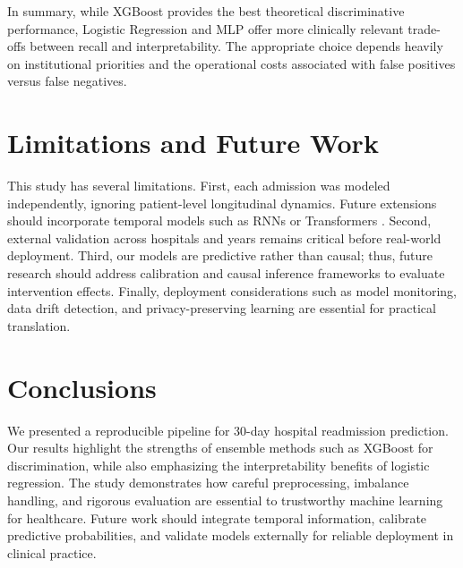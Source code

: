 \documentclass{article}
\begin{document}
In summary, while XGBoost provides the best theoretical discriminative performance, Logistic Regression and MLP offer more clinically relevant trade-offs between recall and interpretability. The appropriate choice depends heavily on institutional priorities and the operational costs associated with false positives versus false negatives. 



\section{Limitations and Future Work}
This study has several limitations. First, each admission was modeled independently, ignoring patient-level longitudinal dynamics. Future extensions should incorporate temporal models such as RNNs \cite{choi2016doctor} or Transformers \cite{vaswani2017attention}. Second, external validation across hospitals and years remains critical before real-world deployment. Third, our models are predictive rather than causal; thus, future research should address calibration \cite{zadrozny2001calibration,platt1999probabilistic} and causal inference frameworks \cite{pearl2009causality,shalit2017estimating} to evaluate intervention effects. Finally, deployment considerations such as model monitoring, data drift detection, and privacy-preserving learning are essential for practical translation.


\section{Conclusions}
We presented a reproducible pipeline for 30-day hospital readmission prediction. Our results highlight the strengths of ensemble methods such as XGBoost for discrimination, while also emphasizing the interpretability benefits of logistic regression. The study demonstrates how careful preprocessing, imbalance handling, and rigorous evaluation are essential to trustworthy machine learning for healthcare. Future work should integrate temporal information, calibrate predictive probabilities, and validate models externally for reliable deployment in clinical practice.

\end{document}
